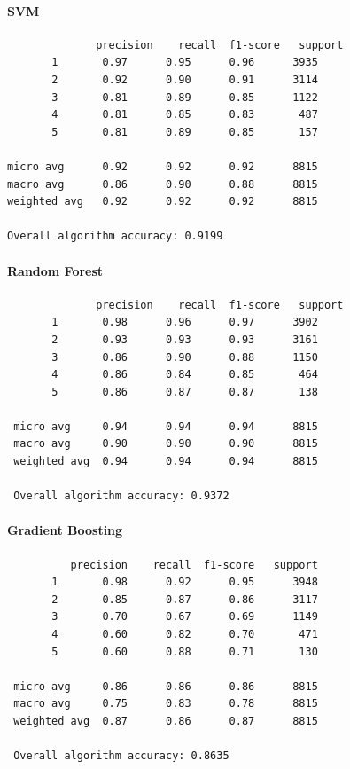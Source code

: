 \hypertarget{svm}{%
\paragraph{SVM}\label{svm}}

\begin{verbatim}
              precision    recall  f1-score   support
       1       0.97      0.95      0.96      3935
       2       0.92      0.90      0.91      3114
       3       0.81      0.89      0.85      1122
       4       0.81      0.85      0.83       487
       5       0.81      0.89      0.85       157
       
micro avg      0.92      0.92      0.92      8815
macro avg      0.86      0.90      0.88      8815
weighted avg   0.92      0.92      0.92      8815

Overall algorithm accuracy: 0.9199
\end{verbatim}

\hypertarget{random-forest}{%
\paragraph{Random Forest}\label{random-forest}}

\begin{verbatim}
              precision    recall  f1-score   support
       1       0.98      0.96      0.97      3902
       2       0.93      0.93      0.93      3161
       3       0.86      0.90      0.88      1150
       4       0.86      0.84      0.85       464
       5       0.86      0.87      0.87       138
       
 micro avg     0.94      0.94      0.94      8815
 macro avg     0.90      0.90      0.90      8815
 weighted avg  0.94      0.94      0.94      8815
 
 Overall algorithm accuracy: 0.9372
\end{verbatim}

\hypertarget{gradient-boosting}{%
\paragraph{Gradient Boosting}\label{gradient-boosting}}

\begin{verbatim}
          precision    recall  f1-score   support
       1       0.98      0.92      0.95      3948
       2       0.85      0.87      0.86      3117
       3       0.70      0.67      0.69      1149
       4       0.60      0.82      0.70       471
       5       0.60      0.88      0.71       130
       
 micro avg     0.86      0.86      0.86      8815
 macro avg     0.75      0.83      0.78      8815
 weighted avg  0.87      0.86      0.87      8815
 
 Overall algorithm accuracy: 0.8635
\end{verbatim}

